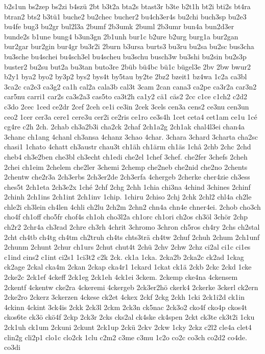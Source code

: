 {b2s1un
bs2zep
bs2zi
b4szü
2bt
b3t2a
bta2s
btast3r
b3te
b2t1h
bt2i
bti2s
bt4ra
btran2
bts2
b3tü1
buche2
bu2chec
bucher2
bu4ch3er4s
bu2chi
buch3sp
bu2e3
bu4fe
bug3
bu2gr
bul2l3a
2bumf
2b3umk
2buml
2b3umr
bun4a
bun2d3er
bunde2s
b1une
bung4
b3un3gn
2b1unh
bur1c
b2ure
b2urg
burg1a
bur2gan
bur2gar
bur2gin
bur4gr
bu3r2i
2burn
b3ursa
burts3
bu3ru
bu2sa
bu2sc
bus3cha
bu3sche
bu4schei
bu4sch3el
bu4scheu
bu3schu
busch3w
bu3shi
bu2sin
bu2s3p
buster2
bu2su
but2a
bu3tan
buto3re
2büb
bü4bc
bü1c
bügel3e
2bv
2bw
bwur2
b2y1
bya2
byo2
by3p2
bys2
bys4t
by5tau
by2te
2bz2
bzeit1
bz4wa
1c2a
ca3bl
3ca2c
ca2e3
ca3g2
ca1h
cal2a
cala3b
cal3t
3cam
2can
cana3
ca2pe
ca3r2a
car3n2
car5nu
carri1
car2s
ca3s2a3
cas5to
ca3t2h
ca1y2
cä1
cäs2
2cc
c1ce
c1ch2
c2d2
c3do
2cec
1ced
ce2dr
2cef
2ceh
ce1i
ce3in
2cek
3cels
cen3a
cens2
ce3nu
cen3un
ceo2
1cer
cer3a
cere1
cere3u
cer2i
ce2ris
ce1ro
ce3s4h
1cet
ceta4
cet1am
ce1u
1cé
cg4re
c2h
2ch.
2chab
ch3a2b3i
cha2ck
2chaf
2ch1a2g
2ch1ak
chal4l3ei
chan4a
3chanc
ch1ang
4chanl
ch3ansa
4chanz
3chao
4char.
3chara
3chard
3charta
cha2sc
chasi1
1chato
4chatt
ch3austr
chau3t
ch1äh
ch1ärm
ch1äs
1châ
2chb
2chc
2chd
cheb4
ch3e2ben
che3bl
ch3echt
ch1edi
che2el
1chef
3chef.
che2fer
3chefs
2cheh
2chei
ch1eim
2chelem
che2ler
3chemi
2chemp
che2neb
che2nid
che2no
2chents
2chentw
che2r3a
2ch3erbs
2ch3er2de
2ch3erfa
4chergeb
2cherke
cher4zie
ch3ess
ches5t
2ch1eta
2ch3e2x
1ché
2chf
2chg
2chh
1chia
chi3na
4chind
3chines
2chinf
2chinh
2ch1ins
2ch1int
2ch1inv
1chip.
1chiru
2chiso
2chj
2chk
2chl2
chl4a
ch2le
chle2i
ch3lein
ch4len
4chli
ch2lu
2ch2m
2chn2
chn4a
chn4e
chner4ei.
2chob
cho3ch
cho4f
ch1off
cho5fr
chof4s
ch1oh
cho3l2a
ch1orc
ch1ori
ch2os
ch3öl
3chör
2chp
ch2r2
2chr4a
ch3rad
2chre
ch3rh
4chrit
3chromo
3chron
ch5ros
ch4ry
2chs
ch2stal
2cht
ch4tb
ch4tg
ch4tm
ch2truh
ch4ts
chts3trä
ch4tw
2chuf
2chuh
2chum
2ch1unf
2chunm
2chunt
2chur
ch1urs
2chut
chut4t
2chü
2chv
2chw
2chz
ci2al
ci1c
ci1es
c1ind
cins2
c1int
ci2s1
1ci3t2
c2k
2ck.
ck1a
1cka.
2cka2b
2cka2c
ck2ad
1ckag
ck2age
2ckal
cka4m
2ckan
2ckap
cka4r1
1ckard
1ckat
ck1ä
2ckb
2ckc
2ckd
1cke
2cke2c
2ck1ef
4ckeff
2ck1eg
2ck1eh
4ck1ei
3ckem.
2ckemp
cke4na
4ckensem
2ckentf
4ckentw
cke2ra
4ckeremi
4ckergeb
2ck3er2hö
ckerk4
2ckerke
3ckerl
ck2ern
2cke2ro
2ckerz
3ckerzen
4ckese
ck2et
4ckex
2ckf
2ckg
2ckh
1cki
2ck1i2d
ck1in
4ckinn
4ckint
3ck4is
2ckk
2ck3l
2ckm
2ck3n
ck5nac
2ck3o2
cko4f
cko4p
ckos4t
ckos6te
ck3ö
ckö4f
2ckp
2ck3r
2cks
cks2al
ck4ske
ck4spen
2ckt
ck3te
ck3t2i
1cku
2ck1uh
ck1um
2ckuni
2ckunt
2ck1up
2ckü
2ckv
2ckw
1cky
2ckz
c2l2
cle4a
clet4
clin2g
cli2p1
clo1c
clo2ck
1clu
c2m2
c3me
c3mu
1c2o
co2c
co3ch
co2d2
co4de.
co3di
}
